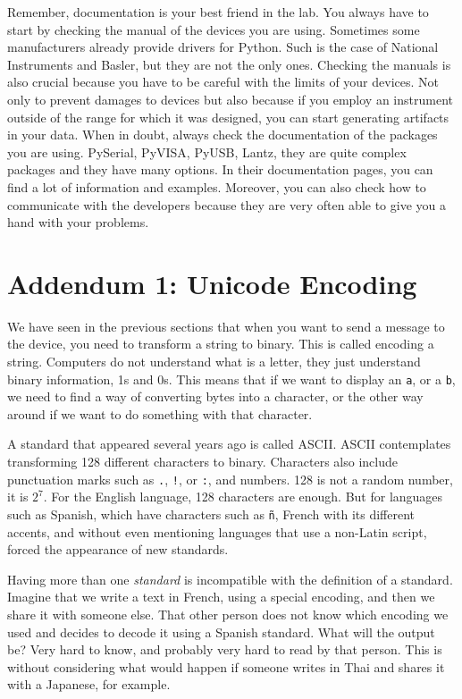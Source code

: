 Remember, documentation is your best friend in the lab. You always have to start by checking the manual of the devices you are using. Sometimes some manufacturers already provide drivers for Python. Such is the case of National Instruments and Basler, but they are not the only ones. Checking the manuals is also crucial because you have to be careful with the limits of your devices. Not only to prevent damages to devices but also because if you employ an instrument outside of the range for which it was designed, you can start generating artifacts in your data. When in doubt, always check the documentation of the packages you are using. PySerial, PyVISA, PyUSB, Lantz, they are quite complex packages and they have many options. In their documentation pages, you can find a lot of information and examples. Moreover, you can also check how to communicate with the developers because they are very often able to give you a hand with your problems. 

\section{Addendum 1: Unicode Encoding}\label{section:unicode}
We have seen in the previous sections that when you want to send a message to the device, you need to transform a string to binary. This is called encoding a string. Computers do not understand what is a letter, they just understand binary information, 1s and 0s. This means that if we want to display an \texttt{a}, or a \texttt{b}, we need to find a way of converting bytes into a character, or the other way around if we want to do something with that character. 

A standard that appeared several years ago is called ASCII. ASCII contemplates transforming 128 different characters to binary. Characters also include punctuation marks such as \texttt{.}, \texttt{!}, or \texttt{:}, and numbers. 128 is not a random number, it is $2^7$. For the English language, 128 characters are enough. But for languages such as Spanish, which have characters such as \texttt{ñ}, French with its different accents, and without even mentioning languages that use a non-Latin script, forced the appearance of new standards. 

Having more than one \textit{standard} is incompatible with the definition of a standard. Imagine that we write a text in French, using a special encoding, and then we share it with someone else. That other person does not know which encoding we used and decides to decode it using a Spanish standard. What will the output be? Very hard to know, and probably very hard to read by that person. This is without considering what would happen if someone writes in Thai and shares it with a Japanese, for example. 

